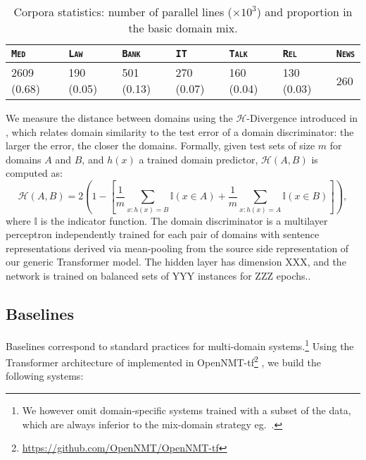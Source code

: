 \documentclass[11pt]{article}
\newcommand{\fyTodo}[1]{\Todo[FY:]{\textcolor{orange}{#1}}}
\newcommand{\domain}[1]{\texttt{\textsc{#1}}}
\begin{document}
\begin{table}[h]
  \centering
  \begin{tabular}{ |lllllll|} %
    \hline
    \domain{Med} & \domain{Law} & \domain{Bank} & \domain{IT} & \domain{Talk} & \domain{Rel} & \domain{News} \\
    \hline
    2609 (0.68) & 190 (0.05)  & 501 (0.13) & 270 (0.07) & 160 (0.04) & 130 (0.03) & 260  \\
    \hline
  \end{tabular}
\caption{Corpora statistics: number of parallel lines ($\times 10^3$) and proportion in the basic domain mix.}
\label{tab:Corpora}
\end{table}

We measure the distance between domains using the $\mathcal{H}$-Divergence introduced in \cite{Ben-David09atheory}, which relates domain similarity to the test error of a domain discriminator: the larger the error, the closer the domains. Formally, given test sets of size $m$ for domains $A$ and $B$, and $h(x)$ a trained domain predictor, $\mathcal{H}(A,B)$ is computed as:
$$
\mathcal{H}(A,B) = 2(1 - [\frac{1}{m} \sum_{x:h(x) = B} \mathbb{I}( x \in A) + \frac{1}{m} \sum_{x: h(x) = A} \mathbb{I}(x \in B)]),
$$
where $\mathbb{I}$ is the indicator function. The  domain discriminator is a multilayer perceptron independently trained for each pair of domains with sentence representations derived via mean-pooling from the source side representation of our generic Transformer model. The hidden layer has dimension XXX, and the network is trained on balanced sets of YYY instances for ZZZ epochs.\fyTodo{TBC}.

\subsection{Baselines \label{ssec:baselines}}

Baselines correspond to standard practices for multi-domain systems.\footnote{We however omit domain-specific systems trained with a subset of the data, which are always inferior to the mix-domain strategy eg.\ \cite{Britz17mixing}.} Using the Transformer architecture of  implemented in OpenNMT-tf\footnote{\url{https://github.com/OpenNMT/OpenNMT-tf}} \cite{Klein17opennmt}, we build the following systems:
\end{document}
